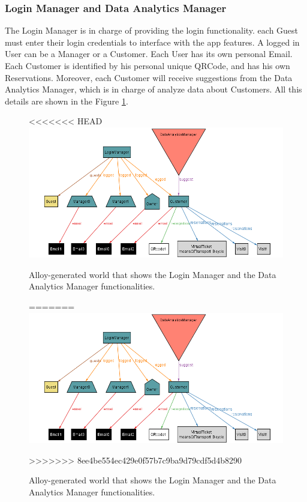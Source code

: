 \documentclass[a4paper, 12pt, oneside]{article}
\begin{document}
\begin{enumerate}[labelindent=20pt, label={UC.\arabic*}, itemindent=1em,leftmargin=!]
\subsubsection{Login Manager and Data Analytics Manager}
The Login Manager is in charge of providing the login functionality. 
each Guest must enter their login credentials to interface with the app features. A logged in User can be a Manager or a Customer. Each User has its own personal Email. Each Customer is identified by his personal unique QRCode, and has his own Reservations. Moreover, each Customer 
will receive suggestions from the Data Analytics Manager, which is in charge of analyze data about Customers. All this details are shown in the Figure \ref{alloy_login}.
\begin{figure}[h!]
\centering
<<<<<<< HEAD
    \centering
    \includegraphics[height=0.32\textheight, scale=0.3, keepaspectratio]{img/alloy/alloy_login_manager.png}
    \caption{Alloy-generated world that shows the Login Manager and the Data Analytics Manager functionalities.}
    \label{alloy_login}
=======
	\centering
  	\includegraphics[height=0.32\textheight, scale=0.3, keepaspectratio]{img/alloy/alloy_login_manager.png}
	\caption{Alloy-generated world that shows the Login Manager and the Data Analytics Manager functionalities.}
 	\label{alloy_login}
>>>>>>> 8ee4be554ec429e0f57b7c9ba9d79cdf5d4b8290
\end{figure}


\end{enumerate}
\end{document}
